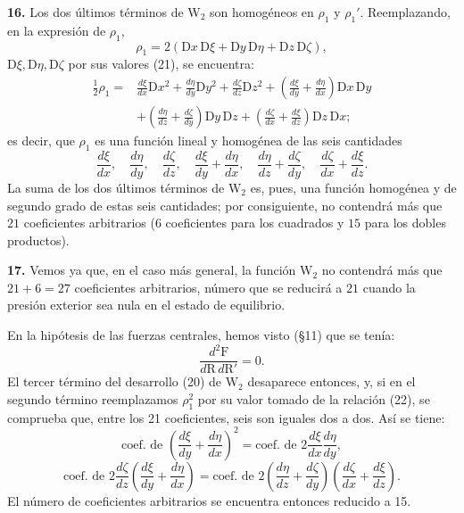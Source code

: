 \noindent\textbf{16.} Los dos últimos términos de $\mathrm{W}_2$ son
homogéneos en $\rho_1$ y $\rho_1'$. Reemplazando, en la expresión de
$\rho_1$,
\[
\rho_1=2(\mathrm{D}x\,\mathrm{D}\xi+\mathrm{D}y\,\mathrm{D}\eta+\mathrm{D}z\,\mathrm{D}\zeta),
\]
$\mathrm{D}\xi,\mathrm{D}\eta,\mathrm{D}\zeta$ por sus valores (21), se
encuentra:
\begin{equation}
\begin{split}
\tfrac12\rho_1={}&\frac{d\xi}{dx}\mathrm{D}x^2+\frac{d\eta}{dy}\mathrm{D}y^2+\frac{d\zeta}{dz}\mathrm{D}z^2
+\left(\frac{d\xi}{dy}+\frac{d\eta}{dx}\right)\mathrm{D}x\,\mathrm{D}y\\
&+\left(\frac{d\eta}{dz}+\frac{d\zeta}{dy}\right)\mathrm{D}y\,\mathrm{D}z
+\left(\frac{d\zeta}{dx}+\frac{d\xi}{dz}\right)\mathrm{D}z\,\mathrm{D}x;
\end{split}
\tag{22}
\end{equation}
es decir, que $\rho_1$ es una función lineal y homogénea de las seis
cantidades
\[
\frac{d\xi}{dx},\quad \frac{d\eta}{dy},\quad \frac{d\zeta}{dz},\quad
\frac{d\xi}{dy}+\frac{d\eta}{dx},\quad \frac{d\eta}{dz}+\frac{d\zeta}{dy},\quad
\frac{d\zeta}{dx}+\frac{d\xi}{dz}.
\]
La suma de los dos últimos términos de $\mathrm{W}_2$
es, pues, una función homogénea y de segundo grado de estas seis
cantidades; por consiguiente, no contendrá más que $21$ coeficientes
arbitrarios ($6$ coeficientes para los cuadrados y $15$ para los dobles
productos).

\noindent\textbf{17.} Vemos ya que, en el caso más general, la función $\mathrm{W}_2$ no
contendrá más que $21+6=27$ coeficientes arbitrarios, número que se
reducirá a $21$ cuando la presión exterior sea nula en el estado de
equilibrio.

En la hipótesis de las fuerzas centrales, hemos visto (§11) que se tenía:
\[
\frac{d^2\mathrm{F}}{d\mathrm{R}\,d\mathrm{R}'}=0.
\]
El tercer término del desarrollo (20) de $\mathrm{W}_2$ desaparece
entonces, y, si en el segundo término reemplazamos $\rho_1^2$ por su valor
tomado de la relación (22), se comprueba que, entre los 21 coeficientes,
seis son iguales dos a dos. Así se tiene:
\[
\text{coef. de }\left(\frac{d\xi}{dy}+\frac{d\eta}{dx}\right)^2
=\text{coef. de }2\frac{d\xi}{dx}\frac{d\eta}{dy},
\]
\[
\text{coef. de }2\frac{d\zeta}{dz}\left(\frac{d\xi}{dy}+\frac{d\eta}{dx}\right)
=\text{coef. de }2\left(\frac{d\eta}{dz}+\frac{d\zeta}{dy}\right)\left(\frac{d\zeta}{dx}+\frac{d\xi}{dz}\right).
\]
El número de coeficientes arbitrarios se encuentra entonces reducido a 15.


